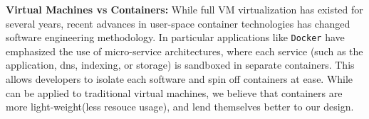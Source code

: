 \noindent
\textbf{Virtual Machines vs Containers:} 
While full VM virtualization has existed for several years, recent advances in user-space container technologies has changed software engineering methodology. 
In particular applications like \texttt{Docker} have emphasized the use of micro-service architectures, where each service (such as the application, dns, indexing, or storage) is sandboxed in separate containers. 
This allows developers to isolate each software and spin off containers at ease.
While \parikshan can be applied to traditional virtual machines, we believe that containers are more light-weight(less resouce usage), and lend themselves better to our design.

%

